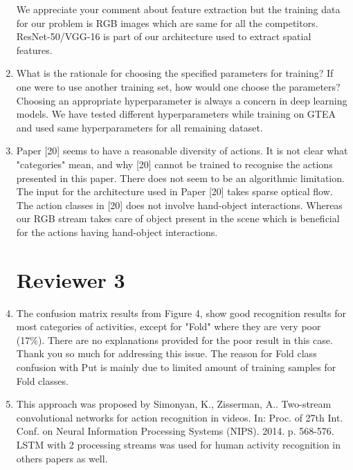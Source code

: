 \documentclass{article}
\begin{document}
\begin{enumerate}
We appreciate your comment about feature extraction but the training data for our problem is RGB images which are same for all the competitors. ResNet-50/VGG-16 is part of our architecture used to extract spatial features. 


\item What is the rationale for choosing the specified parameters for training? If one were to use another training set, how would one choose the parameters? \\

Choosing an appropriate hyperparameter is always a concern in deep learning models. We have tested different hyperparameters while training on GTEA and used same hyperparameters for all remaining dataset.



\item  Paper [20] seems to have a reasonable diversity of actions. It is not clear what "categories" mean, and why [20] cannot be trained to recognise the actions presented in this paper. There does not seem to be an algorithmic limitation.  \\

The input for the architecture used in Paper [20] takes sparse optical flow. The action classes in [20] does not involve hand-object interactions. Whereas our RGB stream takes care of object present in the scene which is beneficial for the actions having hand-object interactions.

\begin{center}
\section*{Reviewer 3}
\end{center}
\item The confusion matrix results from Figure 4, show good recognition results for most categories of activities, except for "Fold" where they are very poor (17\%). There are no explanations provided for the poor result in this case. \\

Thank you so much for addressing this issue. The reason for Fold class confusion with Put is mainly due to limited amount of training samples for Fold classes.

\item This approach was proposed by Simonyan, K., Zisserman, A.. Two-stream convolutional networks for action recognition in videos. In: Proc. of 27th Int. Conf. on Neural Information Processing Systems (NIPS). 2014. p. 568-576. LSTM with 2 processing streams was used for human activity recognition in others papers as well. \\


\end{enumerate}
\end{document}
